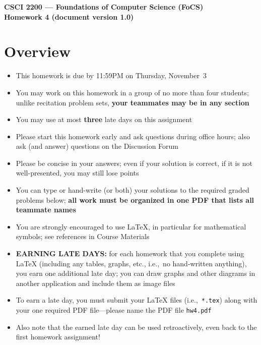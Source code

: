 \documentclass[11pt]{article}
\begin{document}
\thispagestyle{empty}   %

\begin{center}
\large
\textbf{CSCI 2200 --- Foundations of Computer Science (FoCS) \\
Homework 4 (document version 1.0)}
\end{center}

\section*{Overview}
\begin{itemize}
\item This homework is due by 11:59PM on Thursday, November~3
\item You may work on this homework in a group of no more than four students;
  unlike recitation problem sets,
  \textbf{your teammates may be in any section}
\item You may use at most \textbf{three} late days on this assignment
\item Please start this homework early and ask questions during
  office hours; %
  also ask (and answer) questions on the Discussion Forum 
\item Please be concise in your answers;
  even if your solution is correct, if it is not well-presented,
  you may still lose points
\item You can type or hand-write (or both) your solutions
  to the required graded problems below;
  \textbf{all work must be organized in one PDF that lists
  all teammate names}
\item You are strongly encouraged to use LaTeX, in particular for
  mathematical symbols;
  see references in Course Materials
\item \textbf{EARNING LATE DAYS:}
  for each homework that you complete using LaTeX
  (including any tables, graphs, etc., i.e.,~no hand-written anything),
  you earn one additional late day;
  you can draw graphs and other diagrams
  in another application and include them as image files
\item To earn a late day, you must submit your LaTeX files
  (i.e.,~\verb+*.tex+) along with your one required PDF file---please name
  the PDF file \verb+hw4.pdf+
\item Also note that the earned late day can be used
  retroactively, even back to the first homework assignment!
\end{itemize}
\end{document}
